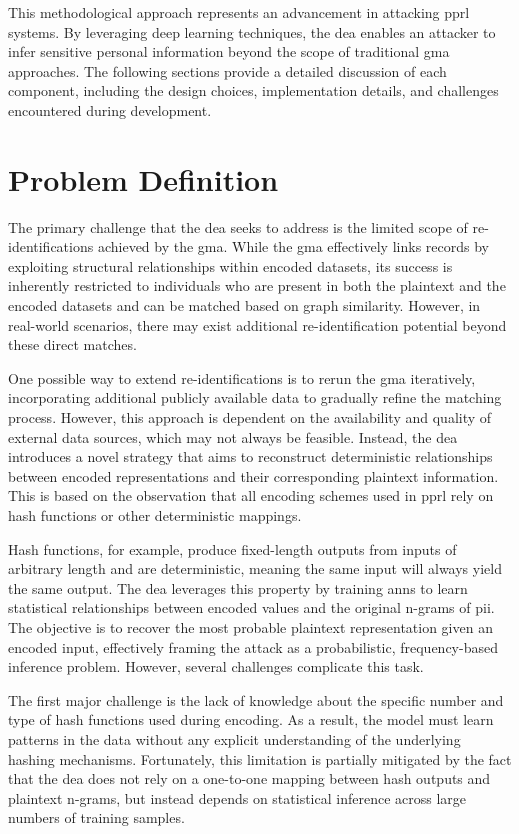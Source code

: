 This methodological approach represents an advancement in attacking \ac{pprl} systems.
By leveraging deep learning techniques, the \ac{dea} enables an attacker to infer sensitive personal information beyond the scope of traditional \ac{gma} approaches.
The following sections provide a detailed discussion of each component, including the design choices, implementation details, and challenges encountered during development.

\section{Problem Definition} \label{sec:problemdefinition}

The primary challenge that the \ac{dea} seeks to address is the limited scope of re-identifications achieved by the \ac{gma}.
While the \ac{gma} effectively links records by exploiting structural relationships within encoded datasets, its success is inherently restricted to individuals who are present in both the plaintext and the encoded datasets and can be matched based on graph similarity.
However, in real-world scenarios, there may exist additional re-identification potential beyond these direct matches.

One possible way to extend re-identifications is to rerun the \ac{gma} iteratively, incorporating additional publicly available data to gradually refine the matching process.
However, this approach is  dependent on the availability and quality of external data sources, which may not always be feasible.
Instead, the \ac{dea} introduces a novel strategy that aims to reconstruct deterministic relationships between encoded representations and their corresponding plaintext information.
This is based on the observation that all encoding schemes used in \ac{pprl} rely on hash functions or other deterministic mappings.

Hash functions, for example, produce fixed-length outputs from inputs of arbitrary length and are deterministic, meaning the same input will always yield the same output.
The \ac{dea} leverages this property by training \ac{ann}s to learn statistical relationships between encoded values and the original n-grams of \ac{pii}.
The objective is to recover the most probable plaintext representation given an encoded input, effectively framing the attack as a probabilistic, frequency-based inference problem.
However, several challenges complicate this task.

The first major challenge is the lack of knowledge about the specific number and type of hash functions used during encoding.
As a result, the model must learn patterns in the data without any explicit understanding of the underlying hashing mechanisms.
Fortunately, this limitation is partially mitigated by the fact that the \ac{dea} does not rely on a one-to-one mapping between hash outputs and plaintext n-grams, but instead depends on statistical inference across large numbers of training samples.

